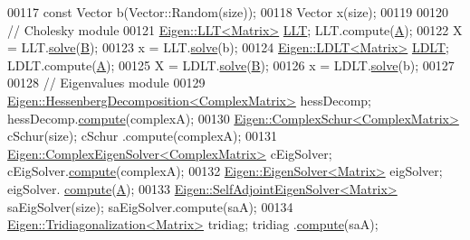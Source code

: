 \begin{DoxyCode}
00117   \textcolor{keyword}{const} Vector b(Vector::Random(size));
00118   Vector x(size);
00119 
00120   \textcolor{comment}{// Cholesky module}
00121   \hyperlink{group___cholesky___module_class_eigen_1_1_l_l_t}{Eigen::LLT<Matrix>}  \hyperlink{group___cholesky___module_class_eigen_1_1_l_l_t}{LLT};  LLT.compute(\hyperlink{group___core___module_class_eigen_1_1_matrix}{A});
00122   X = LLT.\hyperlink{group___cholesky___module_a3738bb3ce6f9b837a2beb432b937499f}{solve}(\hyperlink{group___core___module_class_eigen_1_1_matrix}{B});
00123   x = LLT.\hyperlink{group___cholesky___module_a3738bb3ce6f9b837a2beb432b937499f}{solve}(b);
00124   \hyperlink{group___cholesky___module_class_eigen_1_1_l_d_l_t}{Eigen::LDLT<Matrix>} \hyperlink{group___cholesky___module_class_eigen_1_1_l_d_l_t}{LDLT}; LDLT.compute(\hyperlink{group___core___module_class_eigen_1_1_matrix}{A});
00125   X = LDLT.\hyperlink{group___cholesky___module_aa257dd7a8acf8b347d5a22a13d6ca3e1}{solve}(\hyperlink{group___core___module_class_eigen_1_1_matrix}{B});
00126   x = LDLT.\hyperlink{group___cholesky___module_aa257dd7a8acf8b347d5a22a13d6ca3e1}{solve}(b);
00127 
00128   \textcolor{comment}{// Eigenvalues module}
00129   \hyperlink{group___eigenvalues___module_class_eigen_1_1_hessenberg_decomposition}{Eigen::HessenbergDecomposition<ComplexMatrix>} hessDecomp;   
           hessDecomp.\hyperlink{group___eigenvalues___module_a239a6fd42c57aab3c0b048c47fde3004}{compute}(complexA);
00130   \hyperlink{group___eigenvalues___module_class_eigen_1_1_complex_schur}{Eigen::ComplexSchur<ComplexMatrix>}            cSchur(size);      cSchur
      .compute(complexA);
00131   \hyperlink{group___eigenvalues___module_class_eigen_1_1_complex_eigen_solver}{Eigen::ComplexEigenSolver<ComplexMatrix>}      cEigSolver;        
      cEigSolver.\hyperlink{group___eigenvalues___module_aeb7e38c6db5369f5c974f3786e94c1f0}{compute}(complexA);
00132   \hyperlink{group___eigenvalues___module_class_eigen_1_1_eigen_solver}{Eigen::EigenSolver<Matrix>}                    eigSolver;         eigSolver.
      \hyperlink{group___eigenvalues___module_a38d032b75b3e75640e3db42e7ab20c24}{compute}(\hyperlink{group___core___module_class_eigen_1_1_matrix}{A});
00133   \hyperlink{group___eigenvalues___module_class_eigen_1_1_self_adjoint_eigen_solver}{Eigen::SelfAdjointEigenSolver<Matrix>}         saEigSolver(size); 
      saEigSolver.compute(saA);
00134   \hyperlink{group___eigenvalues___module_class_eigen_1_1_tridiagonalization}{Eigen::Tridiagonalization<Matrix>}             tridiag;           tridiag
      .\hyperlink{group___eigenvalues___module_acd288abb081d3b40b87e4b98cd8f6ee9}{compute}(saA);

\end{DoxyCode}
